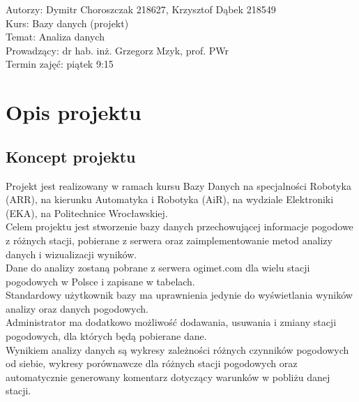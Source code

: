 \documentclass[12pt,a4paper]{article}
\begin{document}
\vspace{20pt}

\flushleft Autorzy: Dymitr Choroszczak 218627, Krzysztof Dąbek 218549\\
Kurs: Bazy danych (projekt)\\
Temat: Analiza danych\\
Prowadzący: dr hab. inż. Grzegorz Mzyk, prof. PWr\\
Termin zajęć: piątek 9:15\\


\newpage

\tableofcontents

\newpage

\section{Opis projektu}

\subsection{Koncept projektu}
\normalsize
Projekt jest realizowany w ramach kursu Bazy Danych na specjalności Robotyka (ARR), na kierunku Automatyka i Robotyka (AiR), na wydziale Elektroniki (EKA), na Politechnice Wrocławskiej.\\
Celem projektu jest stworzenie bazy danych przechowującej informacje pogodowe z różnych stacji, pobierane z serwera oraz zaimplementowanie metod analizy danych i wizualizacji wyników.\\
Dane do analizy zostaną pobrane z serwera ogimet.com dla wielu stacji pogodowych w Polsce i zapisane w tabelach.\\
Standardowy użytkownik bazy ma uprawnienia jedynie do wyświetlania wyników analizy oraz danych pogodowych.\\
Administrator ma dodatkowo możliwość dodawania, usuwania i zmiany stacji pogodowych, dla których będą pobierane dane.\\
Wynikiem analizy danych są wykresy zależności różnych czynników pogodowych od siebie, wykresy porównawcze dla różnych stacji pogodowych oraz automatycznie generowany komentarz dotyczący warunków w pobliżu danej stacji.
\end{document}
